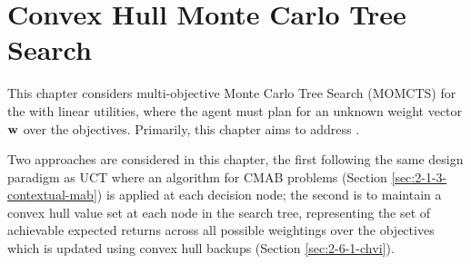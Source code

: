 























\chapter{\label{ch:5-chmcts}Convex Hull Monte Carlo Tree Search}

    \minitoc

    This chapter considers multi-objective Monte Carlo Tree Search (MOMCTS) for the  with linear utilities, where the agent must plan for an unknown weight vector $\mathbf{w}$ over the objectives. Primarily, this chapter aims to address \stochq.
    
    Two approaches are considered in this chapter, the first following the same design paradigm as UCT where an algorithm for CMAB problems (Section \ref{sec:2-1-3-contextual-mab}) is applied at each decision node; the second is to maintain a convex hull value set at each node in the 
    search tree, representing the set of achievable expected returns 
    across all possible weightings over the objectives which is updated using convex hull backups (Section \ref{sec:2-6-1-chvi}). 
    

